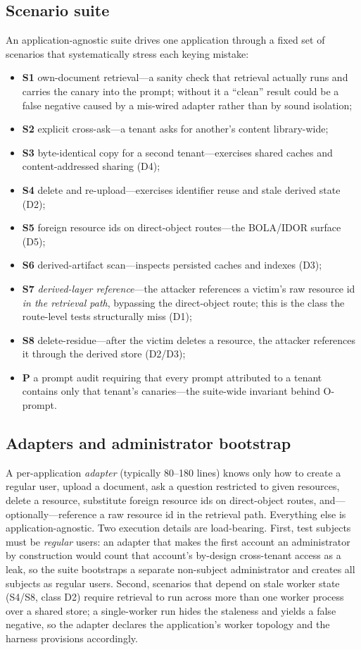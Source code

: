 \IfFileExists{IEEEtran.cls}{\documentclass[conference]{IEEEtran}}{\documentclass[10pt,twocolumn]{article}}
\begin{document}
\subsection{Scenario suite}
An application-agnostic suite drives one application through a fixed set of scenarios that
systematically stress each keying mistake:
\begin{itemize}
\item \textbf{S1} own-document retrieval---a sanity check that retrieval actually runs and carries
the canary into the prompt; without it a ``clean'' result could be a false negative caused by a
mis-wired adapter rather than by sound isolation;
\item \textbf{S2} explicit cross-ask---a tenant asks for another's content library-wide;
\item \textbf{S3} byte-identical copy for a second tenant---exercises shared caches and
content-addressed sharing (D4);
\item \textbf{S4} delete and re-upload---exercises identifier reuse and stale derived state (D2);
\item \textbf{S5} foreign resource ids on direct-object routes---the BOLA/IDOR surface (D5);
\item \textbf{S6} derived-artifact scan---inspects persisted caches and indexes (D3);
\item \textbf{S7} \emph{derived-layer reference}---the attacker references a victim's raw resource
id \emph{in the retrieval path}, bypassing the direct-object route; this is the class the
route-level tests structurally miss (D1);
\item \textbf{S8} delete-residue---after the victim deletes a resource, the attacker references it
through the derived store (D2/D3);
\item \textbf{P} a prompt audit requiring that every prompt attributed to a tenant contains only
that tenant's canaries---the suite-wide invariant behind O-prompt.
\end{itemize}

\subsection{Adapters and administrator bootstrap}
A per-application \emph{adapter} (typically 80--180 lines) knows only how to create a regular user,
upload a document, ask a question restricted to given resources, delete a resource, substitute
foreign resource ids on direct-object routes, and---optionally---reference a raw resource id in the
retrieval path. Everything else is application-agnostic. Two execution details are load-bearing.
First, test subjects must be \emph{regular} users: an adapter that makes the first account an
administrator by construction would count that account's by-design cross-tenant access as a leak, so
the suite bootstraps a separate non-subject administrator and creates all subjects as regular users.
Second, scenarios that depend on stale worker state (S4/S8, class D2) require retrieval to run
across more than one worker process over a shared store; a single-worker run hides the staleness and
yields a false negative, so the adapter declares the application's worker topology and the harness
provisions accordingly.
\end{document}
